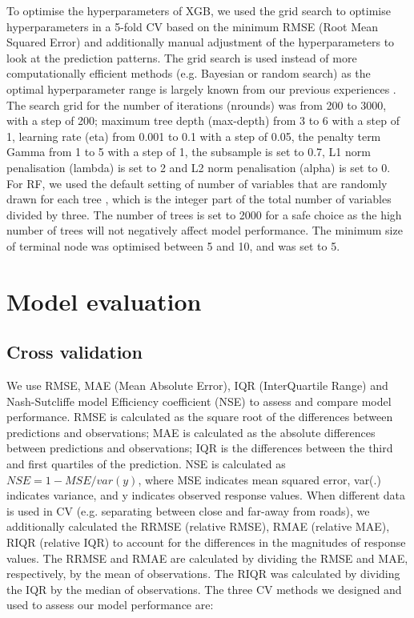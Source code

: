 \documentclass{article}
\begin{document}
To optimise the hyperparameters of XGB, we used the grid search to optimise hyperparameters in a 5-fold CV based on the minimum RMSE (Root Mean Squared Error) and additionally manual adjustment of the hyperparameters to look at the prediction patterns. The grid search is used instead of more computationally efficient methods (e.g. Bayesian or random search) as the optimal hyperparameter range is largely known from our previous experiences \citep{luglobal,nijmegen}. The search grid for the number of iterations (nrounds) was from 200 to 3000, with a step of 200; maximum tree depth (max-depth) from 3 to 6 with a step of 1, learning rate (eta) from 0.001 to 0.1 with a step of 0.05, the penalty term Gamma \citep{xgboost} from 1 to 5 with a step of 1, the subsample is set to 0.7, L1 norm penalisation (lambda) is set to 2 and L2 norm penalisation (alpha) is set to 0. %
For RF, we used the default setting of number of variables that are randomly drawn for each tree \citep{breiman2001random}, which is the integer part of the total number of variables divided by three. The number of trees is set to 2000 for a safe choice as the high number of trees will not negatively affect model performance. The minimum size of terminal node was optimised between 5 and 10, and was set to 5.  




\section{Model evaluation}

\subsection{Cross validation}
We use RMSE, MAE (Mean Absolute Error), IQR (InterQuartile Range) and Nash-Sutcliffe model Efficiency coefficient (NSE) to assess and compare model performance. RMSE is calculated as the square root of the differences between predictions and observations; MAE is calculated as the absolute differences between predictions and observations; IQR is the differences between the third and first quartiles of the prediction. NSE is calculated as $NSE = 1- MSE / var(y)$, where MSE indicates mean squared error, var(.) indicates variance, and y indicates observed response values. %
When different data is used in CV (e.g. separating between close and far-away from roads), we additionally calculated the RRMSE (relative RMSE), RMAE (relative MAE), RIQR (relative IQR) to account for the differences in the magnitudes of response values. The RRMSE and RMAE are calculated by dividing the RMSE and MAE, respectively, by the mean of observations. The RIQR was calculated by dividing the IQR by the median of observations. The three CV methods we designed and used to assess our model performance are: 
\end{document}
